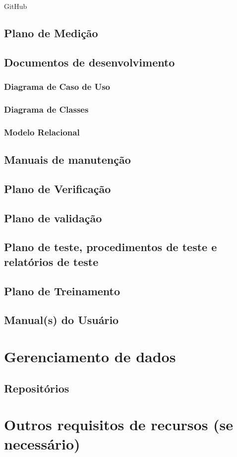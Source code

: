 GitHub

\subsection{Plano de Medição}

\subsection{Documentos de desenvolvimento}

\subsubsection{Diagrama de Caso de Uso}

\subsubsection{Diagrama de Classes}

\subsubsection{Modelo Relacional} 

\subsection{Manuais de manutenção}

\subsection{Plano de Verificação}

\subsection{Plano de validação}

\subsection{Plano de teste, procedimentos de teste e relatórios de teste}

\subsection{Plano de Treinamento}

\subsection{Manual(s) do Usuário}

\section{Gerenciamento de dados}

\subsection{Repositórios}

\section{Outros requisitos de recursos (se necessário)}
